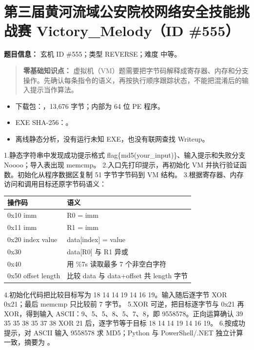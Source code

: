 \section{第三届黄河流域公安院校网络安全技能挑战赛 Victory\_Melody（ID \#555）}\label{ux7b2cux4e09ux5c4aux9ec4ux6cb3ux6d41ux57dfux516cux5b89ux9662ux6821ux7f51ux7edcux5b89ux5168ux6280ux80fdux6311ux6218ux8d5b-victory_melodyid-555}

\textbf{题目信息：} 玄机 ID \#555；类型 REVERSE；难度 中等。

\begin{quote}
\textbf{零基础知识点：} 虚拟机（VM）题需要把字节码解释成寄存器、内存和分支操作。先确认每条指令的语义，再按执行顺序跟踪状态，不能把混淆后的输入提示当作算法。
\end{quote}

\begin{itemize}
\tightlist
\item
  下载包：\texttt{}，13,676 字节；内部为 64 位 PE 程序。
\item
  EXE SHA-256：。
\item
  离线静态分析，没有运行未知 EXE，也没有联网查找 Writeup。
\end{itemize}

1.静态字符串中发现成功提示格式 flag\{md5(your\_input)\}、输入提示和失败分支 Noooo；导入表出现 memcmp。 2.入口先打印提示，再初始化 VM 并执行验证函数。初始化从程序数据区复制 51 字节字节码到 VM 结构。 3.根据寄存器、内存访问和调用目标还原字节码语义：

{\def\LTcaptype{} %
\begin{longtable}[]{@{}ll@{}}
\toprule\noalign{}
操作码 & 语义 \\
\midrule\noalign{}
\endhead
\bottomrule\noalign{}
\endlastfoot
0x10 imm & R0 = imm \\
0x11 imm & R1 = imm \\
0x20 index value & data{[}index{]} = value \\
0x30 & data{[}R0{]} 与 R1 异或 \\
0x40 & 用 \%7s 读取最多 7 个非空白字符 \\
0x50 offset length & 比较 data 与 data+offset 共 length 字节 \\
\end{longtable}
}

4.初始化代码把比较目标写为 18 14 14 19 14 16 19。输入随后逐字节 XOR 0x21；最后 memcmp 只比较前 7 字节。 5.XOR 可逆，把目标逐字节与 0x21 再 XOR，得到输入 ASCII：9、5、5、8、5、7、8，即 9558578。正向运算确认 39 35 35 38 35 37 38 XOR 21 后，逐字节等于目标 18 14 14 19 14 16 19。 6.按成功提示，对 ASCII 输入 9558578 求 MD5；Python 与 PowerShell/.NET 独立计算一致，摘要为 。

